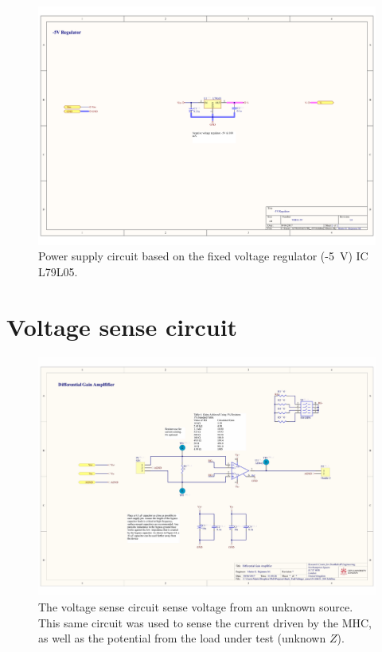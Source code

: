 \begin{landscape}
	\begin{figure}[!htpb]
		\centering
		\includegraphics[width=0.9\paperwidth,keepaspectratio]{MHC_PS_N5}
		\caption[Negative power supply (\SI{-5}{\volt}) for the modified Howland circuit]{Power supply circuit based on the fixed voltage regulator (-\SI{5}{\volt}) IC L79L05.}
		\label{fig:MHC PS -5}
	\end{figure}
\end{landscape}

\section*{Voltage sense circuit}
\label{Appendix: VSense}
\begin{figure}[!htpb]
	\centering
	\includegraphics[width=0.9\paperwidth,keepaspectratio,angle=90]{VSense}
	\caption[Schematic of the voltage sense circuit]{The voltage sense circuit sense voltage from an unknown source. This same circuit was used to sense the current driven by the MHC, as well as the potential from the load under test (unknown $Z$).}
	\label{fig:Voltage sense}
\end{figure}

